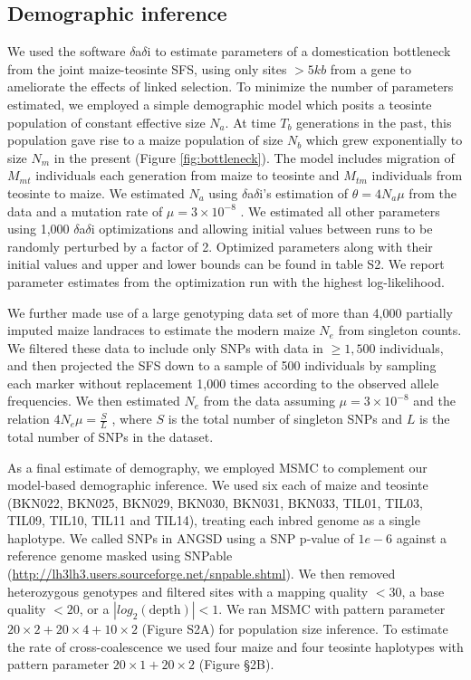 \documentclass[12pt,a4paper]{article}
\begin{document}
\subsection*{Demographic inference}
We used the software $\delta$a$\delta$i \cite{gutenkunst2009} to estimate parameters of a domestication bottleneck from the joint maize-teosinte SFS, using only sites $>5 kb$ from a gene to ameliorate the effects of linked selection.
To minimize the number of parameters estimated, we employed a simple demographic model which posits a teosinte population of constant effective size $N_a$.  At time $T_b$ generations in the past, this population gave rise to a maize population of size $N_b$ which grew exponentially to size $N_m$ in the present (Figure \ref{fig:bottleneck}).
The model includes migration of $M_{mt}$ individuals each generation from maize to teosinte and $M_{tm}$ individuals from teosinte to maize.  We estimated $N_a$ using $\delta$a$\delta$i's estimation of $\theta=4N_a\mu$ from the data and a mutation rate of $\mu = 3 \times 10^{-8}$ \cite{clark2005}. 
We estimated all other parameters using 1,000 $\delta$a$\delta$i optimizations and allowing initial values between runs to be randomly perturbed by a factor of 2.  
Optimized parameters along with their initial values and upper and lower bounds can be found in table S2. We report parameter estimates from the optimization run with the highest log-likelihood.

We further made use of a large genotyping data set of more than 4,000 partially imputed maize landraces \cite{Hearne2015} to estimate the modern maize $N_e$ from singleton counts. 
We filtered these data to include only SNPs with data in $\geq 1,500$ individuals, and then projected the SFS down to a sample of 500 individuals by sampling each marker without replacement 1,000 times according to the observed allele frequencies.
We then estimated $N_e$ from the data assuming $\mu = 3 \times 10^{-8}$ \cite{clark2005} and the relation  $4N_e\mu = \frac{S}{L}$ \cite{fu1993}, where $S$ is the total number of singleton SNPs and $L$ is the total number of SNPs in the dataset.

As a final estimate of demography, we employed MSMC \cite{schiffels2014}  to complement our model-based demographic inference. 
We used six each of maize and teosinte (BKN022, BKN025, BKN029, BKN030, BKN031, BKN033, TIL01, TIL03, TIL09, TIL10, TIL11 and TIL14), treating each inbred genome as a single haplotype.
We called SNPs in ANGSD \cite{korneliussen2014} using a SNP p-value of $1e-6$ against a reference genome masked using SNPable (\url{http://lh3lh3.users.sourceforge.net/snpable.shtml}). 
We then removed heterozygous genotypes and filtered sites with a mapping quality $<30$, a base quality $<20$, or a $|\textit{log}_2(\text{depth})|<1$.
We ran MSMC with pattern parameter $20\times2+20\times4+10\times2$ (Figure S2A) for population size inference. To estimate the rate of cross-coalescence we used four maize and four teosinte haplotypes with pattern parameter $20\times1 + 20\times2$ (Figure \S2B).
\end{document}
